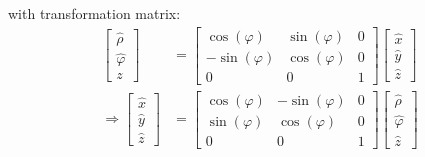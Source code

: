 \documentclass[11pt,a4paper]{article}
\begin{document}
\begin{enumerate}
with transformation matrix:
\begin{align}
\begin{bmatrix}
\hat{\rho} \\
\hat{\varphi} \\
z
\end{bmatrix}
&=
\begin{bmatrix}
\cos(\varphi) & \sin(\varphi) & 0 \\
-\sin(\varphi) & \cos(\varphi) & 0 \\
0 & 0 & 1
\end{bmatrix}
\begin{bmatrix}
\hat{x} \\
\hat{y} \\
\hat{z}
\end{bmatrix}
\\
\Rightarrow
\begin{bmatrix}
\hat{x} \\
\hat{y} \\
\hat{z}
\end{bmatrix}
&=
\begin{bmatrix}
\cos(\varphi) & -\sin(\varphi) & 0 \\
\sin(\varphi) & \cos(\varphi) & 0 \\
0 & 0 & 1
\end{bmatrix}
\begin{bmatrix}
\hat{\rho} \\
\hat{\varphi} \\
\hat{z}
\end{bmatrix}
\end{align}

\end{enumerate}

\newpage
\end{document}
